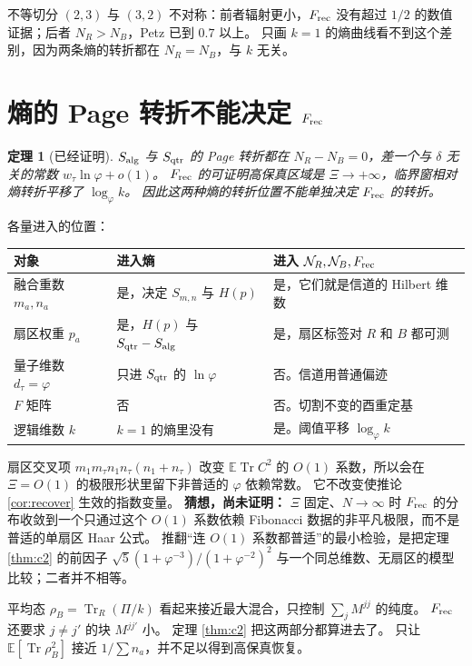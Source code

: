 \documentclass[11pt]{ctexart}
\newtheorem{theorem}{定理}
\theoremstyle{definition}
\theoremstyle{remark}
\newcommand{\E}{\mathbb E}
\newcommand{\Tr}{\operatorname{Tr}}
\newcommand{\ph}{\varphi}
\begin{document}
不等切分 $(2,3)$ 与 $(3,2)$ 不对称：前者辐射更小，$F_{\rm rec}$ 没有超过 $1/2$ 的数值证据；后者 $N_R>N_B$，Petz 已到 $0.7$ 以上。
只画 $k=1$ 的熵曲线看不到这个差别，因为两条熵的转折都在 $N_R=N_B$，与 $k$ 无关。

\section{熵的 Page 转折不能决定 $F_{\rm rec}$}

\begin{theorem}[已经证明]
\label{thm:notentropy}
$S_{\rm alg}$ 与 $S_{\rm qtr}$ 的 Page 转折都在 $N_R-N_B=0$，差一个与 $\delta$ 无关的常数 $w_\tau\ln\ph+o(1)$。
$F_{\rm rec}$ 的可证明高保真区域是 $\Xi\to+\infty$，临界窗相对熵转折平移了 $\log_{\ph}k$。
因此这两种熵的转折位置不能单独决定 $F_{\rm rec}$ 的转折。
\end{theorem}

各量进入的位置：

\begin{center}
\begin{tabular}{@{}lll@{}}
\toprule
对象 & 进入熵 & 进入 $\mathcal N_R,\mathcal N_B,F_{\rm rec}$ \\
\midrule
融合重数 $m_a,n_a$ & 是，决定 $S_{m,n}$ 与 $H(p)$ & 是，它们就是信道的 Hilbert 维数 \\
扇区权重 $p_a$ & 是，$H(p)$ 与 $S_{\rm qtr}-S_{\rm alg}$ & 是，扇区标签对 $R$ 和 $B$ 都可测 \\
量子维数 $d_\tau=\ph$ & 只进 $S_{\rm qtr}$ 的 $\ln\ph$ & 否。信道用普通偏迹 \\
$F$ 矩阵 & 否 & 否。切割不变的酉重定基 \\
逻辑维数 $k$ & $k=1$ 的熵里没有 & 是。阈值平移 $\log_{\ph}k$ \\
\bottomrule
\end{tabular}
\end{center}

扇区交叉项 $m_1m_\tau n_1n_\tau(n_1+n_\tau)$ 改变 $\E\Tr C^2$ 的 $O(1)$ 系数，所以会在 $\Xi=O(1)$ 的极限形状里留下非普适的 $\ph$ 依赖常数。
它不改变使推论 \ref{cor:recover} 生效的指数变量。
\textbf{猜想，尚未证明：} $\Xi$ 固定、$N\to\infty$ 时 $F_{\rm rec}$ 的分布收敛到一个只通过这个 $O(1)$ 系数依赖 Fibonacci 数据的非平凡极限，而不是普适的单扇区 Haar 公式。
推翻“连 $O(1)$ 系数都普适”的最小检验，是把定理 \ref{thm:c2} 的前因子
$\sqrt5(1+\ph^{-3})/(1+\ph^{-2})^2$
与一个同总维数、无扇区的模型比较；二者并不相等。

平均态 $\rho_B=\Tr_R(\Pi/k)$ 看起来接近最大混合，只控制 $\sum_j M^{jj}$ 的纯度。
$F_{\rm rec}$ 还要求 $j\neq j'$ 的块 $M^{jj'}$ 小。
定理 \ref{thm:c2} 把这两部分都算进去了。
只让 $\E[\Tr\rho_B^2]$ 接近 $1/\sum n_a$，并不足以得到高保真恢复。
\end{document}
